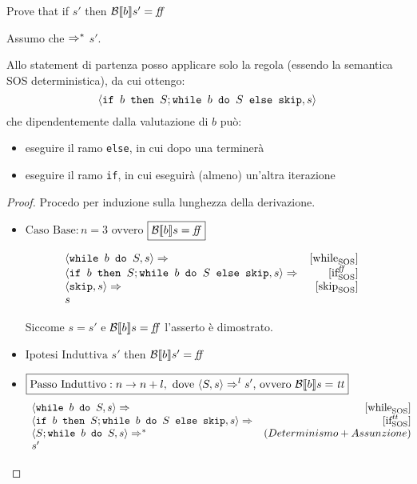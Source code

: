          {
           Prove that if  \Rar{*} $s'$ then $\B{b}' = \semfalse$
         }
         {
           Assumo che  $\Rar{*}$ $s'$.

            Allo statement di partenza posso applicare solo la regola \whileSOS 
            (essendo la semantica SOS deterministica), da cui ottengo:  
           $$
            \confSs{\ifABC{b}{S; \wbS{b}{S}}{\skipForFriends}}{s} 
           $$
            che dipendentemente dalla valutazione di $b$ può: 
            \begin{itemize}
               \item eseguire il ramo \texttt{else}, in cui dopo una 
               \skipForFriends{} terminerà 
               \item eseguire il ramo \texttt{if}, in cui eseguirà (almeno) 
               un'altra iterazione
            \end{itemize}
           \begin{proof}
                        Procedo per induzione sulla lunghezza della derivazione.

           \begin{itemize}
             \item $\boxed{\text{Caso Base}: n = 3}$ ovvero 
           $\boxed{\B{b} = \semfalse}$ 

          $$
          \begin{array}{lrr}
    \confSs{\wbS{b}{S}}{s} \Rar{} & \whileSOS & \\
    \confSs{\ifABC{b}{S; \wbS{b}{S}}{\skipForFriends}}{s} \Rar{} & \ifffSOS & \\
    \confSs{\skipForFriends}{s} \Rar{} & \skipSOS & \\
    s & & \\
          \end{array}
          $$

           Siccome $s = s'$ e $\B{b} = \semfalse$ l'asserto è dimostrato.

           \item $\boxed{\text{Ipotesi Induttiva}} $  \Rar{*} $s'$ then $\B{b}' = \semfalse$

           \item $\boxed{\text{Passo Induttivo}: n \rightarrow n + l,
             \text{ dove } \confSs{S}{s} \Rar{l} s' \text{, ovvero } \B{b} = \semtrue}$
          $$
          \begin{array}{lrr}
    \confSs{\wbS{b}{S}}{s} \Rar{} & \whileSOS & \\
    \confSs{\ifABC{b}{S; \wbS{b}{S}}{\skipForFriends}}{s} \Rar{} & \ifttSOS & \\
    \confSs{S; \wbS{b}{S}}{s} \Rar{*} & (Determinismo + Assunzione) & \\
    s' & & \\
          \end{array}
          $$


\end{itemize}
\end{proof}}
